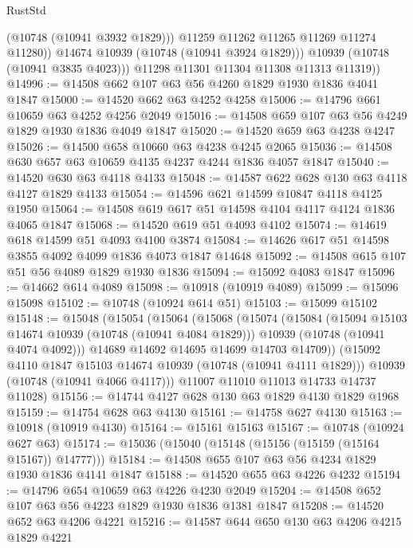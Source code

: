 \begin{lexlean}{RustStd}
\begin{coremodule}
                  (@10748 (@10941 @3932 @1829)))
                @11259
                @11262
                @11265
                @11269
                @11274
                @11280))
            @14674
            @10939
            (@10748 (@10941 @3924 @1829)))
          @10939
          (@10748 (@10941 @3835 @4023)))
        @11298
        @11301
        @11304
        @11308
        @11313
        @11319))
@14996 := @14508 @662 @107 @63 @56 @4260 @1829 @1930 @1836 @4041 @1847
@15000 := @14520 @662 @63 @4252 @4258
@15006 := @14796 @661 @10659 @63 @4252 @4256 @2049
@15016 := @14508 @659 @107 @63 @56 @4249 @1829 @1930 @1836 @4049 @1847
@15020 := @14520 @659 @63 @4238 @4247
@15026 := @14500 @658 @10660 @63 @4238 @4245 @2065
@15036 := @14508 @630 @657 @63 @10659 @4135 @4237 @4244 @1836 @4057 @1847
@15040 := @14520 @630 @63 @4118 @4133
@15048 := @14587 @622 @628 @130 @63 @4118 @4127 @1829 @4133
@15054 := @14596 @621 @14599 @10847 @4118 @4125 @1950
@15064 := @14508 @619 @617 @51 @14598 @4104 @4117 @4124 @1836 @4065 @1847
@15068 := @14520 @619 @51 @4093 @4102
@15074 := @14619 @618 @14599 @51 @4093 @4100 @3874
@15084 := @14626 @617 @51 @14598 @3855 @4092 @4099 @1836 @4073 @1847 @14648
@15092 := @14508 @615 @107 @51 @56 @4089 @1829 @1930 @1836
@15094 := @15092 @4083 @1847
@15096 := @14662 @614 @4089
@15098 := @10918 (@10919 @4089)
@15099 := @15096 @15098
@15102 := @10748 (@10924 @614 @51)
@15103 := @15099 @15102
@15148 := @15048
    (@15054
      (@15064
        (@15068
          (@15074
            (@15084
              (@15094 @15103 @14674 @10939 (@10748 (@10941 @4084 @1829)))
              @10939
              (@10748 (@10941 @4074 @4092)))
            @14689
            @14692
            @14695
            @14699
            @14703
            @14709))
        (@15092 @4110 @1847 @15103 @14674 @10939 (@10748 (@10941 @4111 @1829)))
        @10939
        (@10748 (@10941 @4066 @4117)))
      @11007
      @11010
      @11013
      @14733
      @14737
      @11028)
@15156 := @14744 @4127 @628 @130 @63 @1829 @4130 @1829 @1968
@15159 := @14754 @628 @63 @4130
@15161 := @14758 @627 @4130
@15163 := @10918 (@10919 @4130)
@15164 := @15161 @15163
@15167 := @10748 (@10924 @627 @63)
@15174 := @15036 (@15040 (@15148 (@15156 (@15159 (@15164 @15167)) @14777)))
@15184 := @14508 @655 @107 @63 @56 @4234 @1829 @1930 @1836 @4141 @1847
@15188 := @14520 @655 @63 @4226 @4232
@15194 := @14796 @654 @10659 @63 @4226 @4230 @2049
@15204 := @14508 @652 @107 @63 @56 @4223 @1829 @1930 @1836 @1381 @1847
@15208 := @14520 @652 @63 @4206 @4221
@15216 := @14587 @644 @650 @130 @63 @4206 @4215 @1829 @4221

\end{coremodule}
\end{lexlean}
